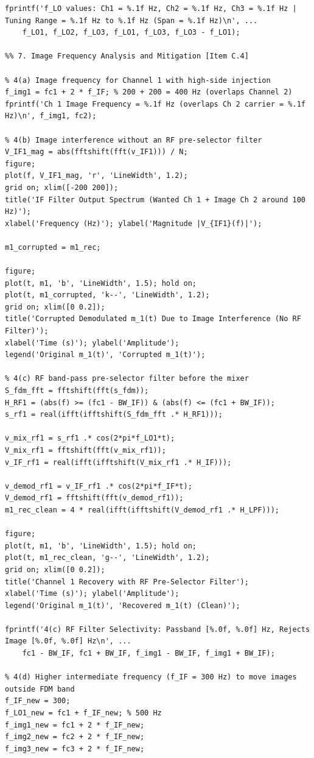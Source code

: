 \documentclass[a4paper]{article}
\begin{document}
\begin{lstlisting}[frame=single, breaklines=true, basicstyle=\ttfamily\scriptsize]
fprintf('f_LO values: Ch1 = %.1f Hz, Ch2 = %.1f Hz, Ch3 = %.1f Hz | Tuning Range = %.1f Hz to %.1f Hz (Span = %.1f Hz)\n', ...
    f_LO1, f_LO2, f_LO3, f_LO1, f_LO3, f_LO3 - f_LO1);

%% 7. Image Frequency Analysis and Mitigation [Item C.4]

% 4(a) Image frequency for Channel 1 with high-side injection
f_img1 = fc1 + 2 * f_IF; % 200 + 200 = 400 Hz (overlaps Channel 2)
fprintf('Ch 1 Image Frequency = %.1f Hz (overlaps Ch 2 carrier = %.1f Hz)\n', f_img1, fc2);

% 4(b) Image interference without an RF pre-selector filter
V_IF1_mag = abs(fftshift(fft(v_IF1))) / N;
figure;
plot(f, V_IF1_mag, 'r', 'LineWidth', 1.2);
grid on; xlim([-200 200]);
title('IF Filter Output Spectrum (Wanted Ch 1 + Image Ch 2 around 100 Hz)');
xlabel('Frequency (Hz)'); ylabel('Magnitude |V_{IF1}(f)|');

m1_corrupted = m1_rec;

figure;
plot(t, m1, 'b', 'LineWidth', 1.5); hold on;
plot(t, m1_corrupted, 'k--', 'LineWidth', 1.2);
grid on; xlim([0 0.2]);
title('Corrupted Demodulated m_1(t) Due to Image Interference (No RF Filter)');
xlabel('Time (s)'); ylabel('Amplitude');
legend('Original m_1(t)', 'Corrupted m_1(t)');

% 4(c) RF band-pass pre-selector filter before the mixer
S_fdm_fft = fftshift(fft(s_fdm));
H_RF1 = (abs(f) >= (fc1 - BW_IF)) & (abs(f) <= (fc1 + BW_IF));
s_rf1 = real(ifft(ifftshift(S_fdm_fft .* H_RF1)));

v_mix_rf1 = s_rf1 .* cos(2*pi*f_LO1*t);
V_mix_rf1 = fftshift(fft(v_mix_rf1));
v_IF_rf1 = real(ifft(ifftshift(V_mix_rf1 .* H_IF)));

v_demod_rf1 = v_IF_rf1 .* cos(2*pi*f_IF*t);
V_demod_rf1 = fftshift(fft(v_demod_rf1));
m1_rec_clean = 4 * real(ifft(ifftshift(V_demod_rf1 .* H_LPF)));

figure;
plot(t, m1, 'b', 'LineWidth', 1.5); hold on;
plot(t, m1_rec_clean, 'g--', 'LineWidth', 1.2);
grid on; xlim([0 0.2]);
title('Channel 1 Recovery with RF Pre-Selector Filter');
xlabel('Time (s)'); ylabel('Amplitude');
legend('Original m_1(t)', 'Recovered m_1(t) (Clean)');

fprintf('4(c) RF Filter Selectivity: Passband [%.0f, %.0f] Hz, Rejects Image [%.0f, %.0f] Hz\n', ...
    fc1 - BW_IF, fc1 + BW_IF, f_img1 - BW_IF, f_img1 + BW_IF);

% 4(d) Higher intermediate frequency (f_IF = 300 Hz) to move images outside FDM band
f_IF_new = 300;
f_LO1_new = fc1 + f_IF_new; % 500 Hz
f_img1_new = fc1 + 2 * f_IF_new;
f_img2_new = fc2 + 2 * f_IF_new;
f_img3_new = fc3 + 2 * f_IF_new;


\end{lstlisting}
\end{document}
